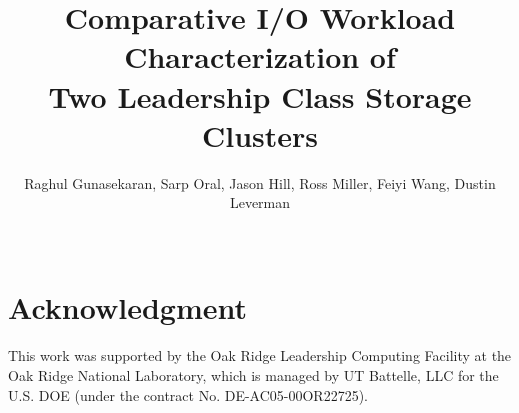 \documentclass{sig-alternate-05-2015}
\begin{document}


\title{Comparative I/O Workload Characterization of\\
Two Leadership Class Storage Clusters}
%
%
%
%
%

%

\author{ 
\alignauthor
Raghul Gunasekaran, Sarp Oral, Jason Hill, Ross Miller, Feiyi Wang, Dustin Leverman\\
\vspace{0.05in}
\\
\vspace{0.05in}
}


\maketitle



 
%
%


\section*{Acknowledgment}
This work was supported by the Oak Ridge Leadership Computing Facility at the Oak Ridge National Laboratory, which is managed by UT Battelle, LLC for the U.S. DOE (under the contract No. DE-AC05-00OR22725).

\nocite{reference}


\end{document}
